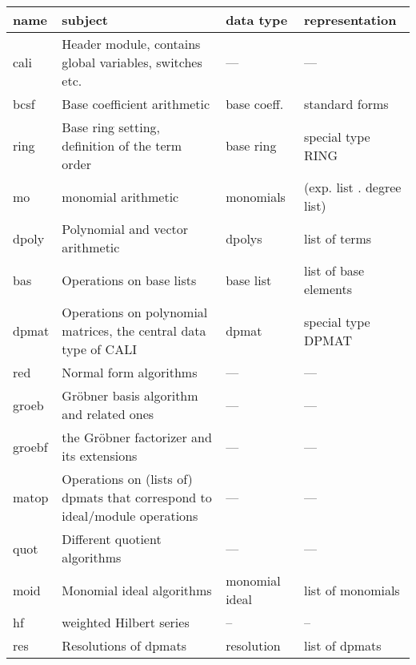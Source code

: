 \begin{tabular}{|p{1.5cm}||p{5.5cm}|p{2cm}|p{4cm}|}
\hline
\sloppy

name & subject & data type & representation \\
\hline

cali & Header module, contains \linebreak
global variables, switches etc. & --- & ---\\

bcsf & Base coefficient arithmetic & base coeff. & standard forms \\

ring & Base ring setting, definition of the term order & base ring &
special type RING\\

mo & monomial arithmetic & monomials & (exp. list . degree list)\\

dpoly & Polynomial and vector arith\-metic & dpolys & list of terms\\

bas & Operations on base lists & base list & list of base elements \\

dpmat & Operations on polynomial matrices, the central data type of
CALI & dpmat & special type DPMAT\\

red & Normal form algorithms & --- & ---\\

groeb & Gr\"obner basis algorithm and related ones & --- & ---\\

groebf & the Gr\"obner factorizer and its extensions  & --- & ---\\

matop & Operations on (lists of) \linebreak dpmats that correspond to
ideal/module operations & --- & ---\\

quot & Different quotient algorithms & --- & --- \\

moid & Monomial ideal algorithms & monomial ideal & list of monomials \\

hf & weighted Hilbert series & -- & -- \\

res & Resolutions of dpmats & resolution & list of dpmats \\


\end{tabular}
